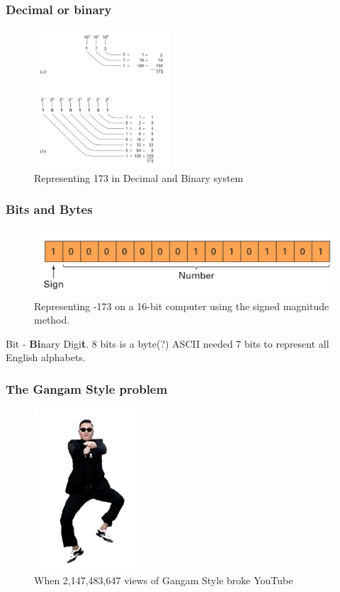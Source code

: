 \documentclass[notes]{beamer}
\begin{document}
\begin{frame}
	\frametitle{Decimal or binary}
	\begin{figure}[ht]
		\centering
		\includegraphics[width=0.45\textwidth]{figs/decimal-binary.png}
		\caption*{Representing 173 in Decimal and Binary system}
	\end{figure}
\end{frame}

\begin{frame}
	\frametitle{Bits and Bytes}
	\begin{figure}[ht]
		\centering
		\includegraphics[width=\textwidth]{figs/binary-representation.png}
		\caption*{Representing -173 on a 16-bit computer using the signed
			magnitude method.}
		
	\end{figure}
	Bit - \textbf{Bi}nary Digi\textbf{t}. 8 bits is a byte(?)
	ASCII needed 7 bits to represent all English alphabets.
\end{frame}

\begin{frame}
	\frametitle{The Gangam Style problem}
	\begin{figure}[ht]
		\centering
		\includegraphics[width=0.35\textwidth]{figs/gangam.png}
		\caption*{When 2,147,483,647 views of Gangam Style broke YouTube}
	\end{figure}
\end{frame}
\end{document}
